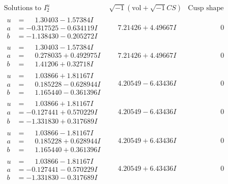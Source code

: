 \documentclass[1p]{elsarticle_modified}
\theoremstyle{definition}
\newcommand{\I}{\sqrt{-1}}
\begin{document}
$$\begin{array}{c|c|c}
\text{Solutions to }I^u_{2}& \I (\text{vol} + \sqrt{-1}CS) & \text{Cusp shape}\\
 \hline 
\begin{aligned}
u &= \phantom{-}1.30403 - 1.57384 I \\
a &= -0.317525 - 0.634119 I \\
b &= -1.138430 - 0.205272 I\end{aligned}
 & \phantom{-}7.21426 + 4.49667 I & \phantom{-0.000000 } 0 \\ \hline\begin{aligned}
u &= \phantom{-}1.30403 - 1.57384 I \\
a &= \phantom{-}0.278035 + 0.492975 I \\
b &= \phantom{-}1.41206 + 0.32718 I\end{aligned}
 & \phantom{-}7.21426 + 4.49667 I & \phantom{-0.000000 } 0 \\ \hline\begin{aligned}
u &= \phantom{-}1.03866 + 1.81167 I \\
a &= \phantom{-}0.185228 - 0.628944 I \\
b &= \phantom{-}1.165440 - 0.361396 I\end{aligned}
 & \phantom{-}4.20549 - 6.43436 I & \phantom{-0.000000 } 0 \\ \hline\begin{aligned}
u &= \phantom{-}1.03866 + 1.81167 I \\
a &= -0.127441 + 0.570229 I \\
b &= -1.331830 + 0.317689 I\end{aligned}
 & \phantom{-}4.20549 - 6.43436 I & \phantom{-0.000000 } 0 \\ \hline\begin{aligned}
u &= \phantom{-}1.03866 - 1.81167 I \\
a &= \phantom{-}0.185228 + 0.628944 I \\
b &= \phantom{-}1.165440 + 0.361396 I\end{aligned}
 & \phantom{-}4.20549 + 6.43436 I & \phantom{-0.000000 } 0 \\ \hline\begin{aligned}
u &= \phantom{-}1.03866 - 1.81167 I \\
a &= -0.127441 - 0.570229 I \\
b &= -1.331830 - 0.317689 I\end{aligned}
 & \phantom{-}4.20549 + 6.43436 I & \phantom{-0.000000 } 0 \\ \hline\begin{aligned}

\end{aligned}
\end{array}$$
\end{document}
